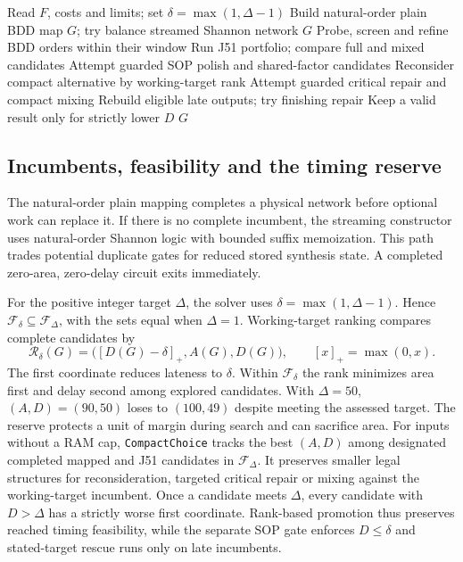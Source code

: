 \documentclass[journal,10pt]{IEEEtran}
\newcommand{\rank}{\mathcal{R}}
\newcommand{\clip}[1]{[#1]_+}
\begin{document}
\begin{algorithm}[!t]
\caption{Integrated controller on completed networks}
\label{alg:main}
\footnotesize
\begin{algorithmic}[1]
\State Read \(F\), costs and limits; set \(\delta=\max(1,\Delta-1)\)
\State Build natural-order plain BDD map \(G\); try balance
 \State \Return streamed Shannon network \EndIf
{} \State \Return \(G\) \EndIf
\State Probe, screen and refine BDD orders within their window
  \State Run J51 portfolio; compare full and mixed candidates
\EndIf
\State Attempt guarded SOP polish and shared-factor candidates
\State Reconsider compact alternative by working-target rank
\State Attempt guarded critical repair and compact mixing
  \State Rebuild eligible late outputs; try finishing repair
  \State Keep a valid result only for strictly lower \(D\)
\EndIf
\State \Return \(G\)
\end{algorithmic}
\end{algorithm}

\subsection{Incumbents, feasibility and the timing reserve}
The natural-order plain mapping completes a physical network before optional work can replace it. If there is no complete incumbent, the streaming constructor uses natural-order Shannon logic with bounded suffix memoization. This path trades potential duplicate gates for reduced stored synthesis state. A completed zero-area, zero-delay circuit exits immediately.

For the positive integer target \(\Delta\), the solver uses \(\delta=\max(1,\Delta-1)\). Hence \(\mathcal F_\delta\subseteq\mathcal F_\Delta\), with the sets equal when \(\Delta=1\). Working-target ranking compares complete candidates by
\begin{equation}
 \rank_{\delta}(G)=\bigl(\clip{D(G)-\delta}, A(G), D(G)\bigr),
 \qquad [x]_+=\max(0,x).
 \label{eq:rank}
\end{equation}
The first coordinate reduces lateness to \(\delta\). Within \(\mathcal F_\delta\) the rank minimizes area first and delay second among explored candidates. With \(\Delta=50\), \((A,D)=(90,50)\) loses to \((100,49)\) despite meeting the assessed target. The reserve protects a unit of margin during search and can sacrifice area. For inputs without a RAM cap, \texttt{CompactChoice} tracks the best \((A,D)\) among designated completed mapped and J51 candidates in \(\mathcal F_\Delta\). It preserves smaller legal structures for reconsideration, targeted critical repair or mixing against the working-target incumbent. Once a candidate meets \(\Delta\), every candidate with \(D>\Delta\) has a strictly worse first coordinate. Rank-based promotion thus preserves reached timing feasibility, while the separate SOP gate enforces \(D\le\delta\) and stated-target rescue runs only on late incumbents.
\end{document}
